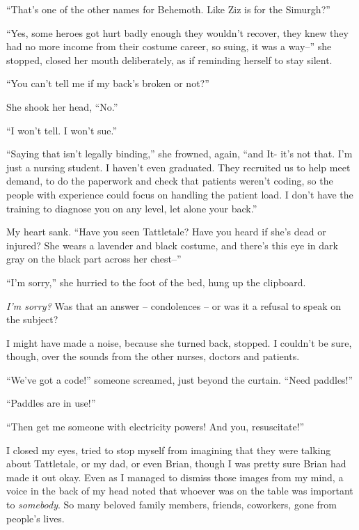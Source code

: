 ``That's one of the other names for Behemoth.  Like Ziz is for the Simurgh?''



``Yes, some heroes got hurt badly enough they wouldn't recover, they knew they had no more income from their costume career, so suing, it was a way--'' she stopped, closed her mouth deliberately, as if reminding herself to stay silent.



``You can't tell me if my back's broken or not?''



She shook her head, ``No.''



``I won't tell.  I won't sue.''



``Saying that isn't legally binding,'' she frowned, again, ``and It- it's not that.  I'm just a nursing student.  I haven't even graduated.  They recruited us to help meet demand, to do the paperwork and check that patients weren't coding, so the people with experience could focus on handling the patient load.  I don't have the training to diagnose you on any level, let alone your back.''



My heart sank.  ``Have you seen Tattletale?  Have you heard if she's dead or injured?  She wears a lavender and black costume, and there's this eye in dark gray on the black part across her chest--''



``I'm sorry,'' she hurried to the foot of the bed, hung up the clipboard.



\emph{I'm sorry?  }Was that an answer – condolences – or was it a refusal to speak on the subject?



I might have made a noise, because she turned back, stopped.  I couldn't be sure, though, over the sounds from the other nurses, doctors and patients.



``We've got a code!'' someone screamed, just beyond the curtain.  ``Need paddles!''



``Paddles are in use!''



``Then get me someone with electricity powers!  And you, resuscitate!''



I closed my eyes, tried to stop myself from imagining that they were talking about Tattletale, or my dad, or even Brian, though I was pretty sure Brian had made it out okay.  Even as I managed to dismiss those images from my mind, a voice in the back of my head noted that whoever was on the table was important to \emph{somebody}.  So many beloved family members, friends, coworkers, gone from people's lives.



